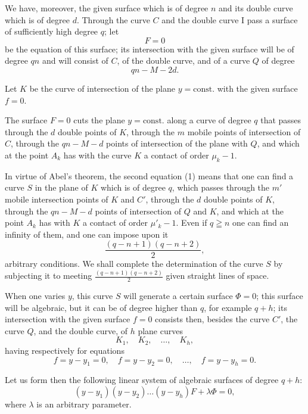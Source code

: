 \documentclass{article}
\begin{document}
We have, moreover, the given surface which is of degree $n$ and its double curve which is of degree $d$. Through the curve $C$ and the double curve I pass a surface of sufficiently high degree $q$; let
\[
F = 0
\]
be the equation of this surface; its intersection with the given surface will be of degree $qn$ and will consist of $C$, of the double curve, and of a curve $Q$ of degree
\[
qn - M - 2d.
\]

Let $K$ be the curve of intersection of the plane $y = \text{const.}$ with the given surface $f = 0$.

The surface $F = 0$ cuts the plane $y = \text{const.}$ along a curve of degree $q$ that passes through the $d$ double points of $K$, through the $m$ mobile points of intersection of $C$, through the $qn - M - d$ points of intersection of the plane with $Q$, and which at the point $A_{k}$ has with the curve $K$ a contact of order $\mu_{k} - 1$.

In virtue of Abel's theorem, the second equation (1) means that one can find a curve $S$ in the plane of $K$ which is of degree $q$, which passes through the $m'$ mobile intersection points of $K$ and $C'$, through the $d$ double points of $K$, through the $qn - M - d$ points of intersection of $Q$ and $K$, and which at the point $A_{k}$ has with $K$ a contact of order $\mu'_{k} - 1$. Even if $q \geqq n$ one can find an infinity of them, and one can impose upon it
\[
\frac{(q - n + 1)(q - n + 2)}{2},
\]
arbitrary conditions. We shall complete the determination of the curve $S$ by subjecting it to meeting $\frac{(q - n + 1)(q - n + 2)}{2}$ given straight lines of space.

When one varies $y$, this curve $S$ will generate a certain surface $\Phi = 0$; this surface will be algebraic, but it can be of
degree higher than $q$, for example $q + h$; its intersection with the given surface $f = 0$ consists then, besides the curve $C'$, the curve $Q$, and the double curve, of $h$ plane curves
\[
K_{1}, \quad K_{2}, \quad \ldots, \quad K_{h},
\]
having respectively for equations
\[
f = y - y_{1} = 0, \quad f = y - y_{2} = 0, \quad \ldots, \quad f = y - y_{h} = 0.
\]

Let us form then the following linear system of algebraic surfaces of degree $q + h$:
\[
(y - y_{1})(y - y_{2}) \ldots (y - y_{h}) F + \lambda\Phi = 0,
\]
where $\lambda$ is an arbitrary parameter.
\end{document}
